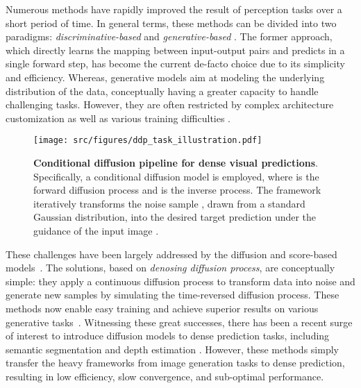 \documentclass[10pt,twocolumn,letterpaper]{article}
\begin{document}
Numerous methods have rapidly improved the result of perception tasks over a short period of time.
In general terms, these methods can be divided into two paradigms: \textit{discriminative-based} 
 \cite{fu2018deep,zhao2017pyramid,xie2021segformer,cheng2022masked} and \textit{generative-based} 
\cite{xie2017adversarial,hendrik2017universal,isola2017image,li2021semantic,yeh2017semantic}. 
The former approach, which directly learns the mapping between input-output pairs and predicts in a single forward step, has become the current de-facto choice due to its simplicity and efficiency.
Whereas, generative models aim at modeling the underlying distribution of the data, conceptually having a greater capacity to handle challenging tasks.
However, they are often restricted by complex architecture customization as well as various training difficulties \cite{salimans2016improved,karras2018progressive,brock2019large}.
\begin{figure}[t!]
    \centering
    \texttt{[image: src/figures/ddp\_task\_illustration.pdf]}
    \caption{\textbf{Conditional diffusion pipeline for dense visual predictions}. Specifically, a conditional diffusion model is employed, where  is the forward diffusion process and  is the inverse process. The framework iteratively transforms the noise sample , drawn from a standard Gaussian distribution, into the desired target prediction  under the guidance of the input image .}
    \label{fig_intro_task}
\end{figure}


These challenges have been largely addressed by the diffusion and score-based models~\cite{ho2020denoising,sohl2015deep,song2020improved}.
The solutions, based on \textit{denosing diffusion process}, are conceptually simple:
they apply a continuous diffusion process to transform data into noise and generate new samples by simulating the time-reversed diffusion process.
These methods now enable easy training and achieve superior results on various generative tasks~\cite{nichol2021glide,saharia2022photorealistic,rombach2022high,ramesh2022hierarchical}.
Witnessing these great successes, there has been a recent surge of interest to introduce diffusion models to dense prediction tasks, including semantic segmentation \cite{amit2021segdiff,chen2022generalist,wu2022medsegdiff,wolleb2022diffusion} and depth estimation \cite{saxena2023depthgen}.
However, these methods simply transfer the heavy frameworks from image generation tasks to dense prediction, resulting in low efficiency, slow convergence, and sub-optimal performance.
\end{document}
